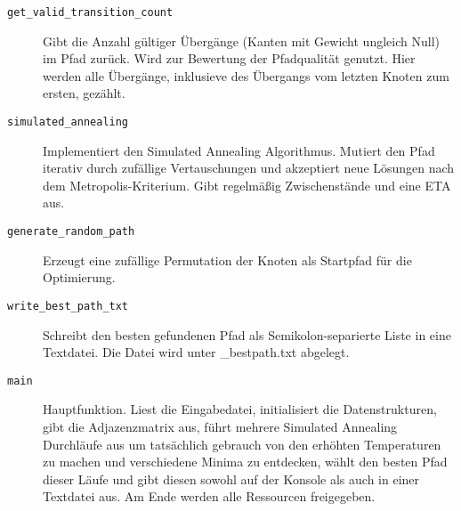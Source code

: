 \documentclass{article}
\begin{document}
\begin{description}
    \item[\texttt{get\_valid\_transition\_count}] Gibt die Anzahl gültiger Übergänge (Kanten mit Gewicht ungleich Null) im Pfad zurück. Wird zur Bewertung der Pfadqualität genutzt. Hier werden alle Übergänge, inklusieve des Übergangs vom letzten Knoten zum ersten, gezählt.
    \item[\texttt{simulated\_annealing}] Implementiert den Simulated Annealing Algorithmus. Mutiert den Pfad iterativ durch zufällige Vertauschungen und akzeptiert neue Lösungen nach dem Metropolis-Kriterium. Gibt regelmäßig Zwischenstände und eine ETA aus.
    \item[\texttt{generate\_random\_path}] Erzeugt eine zufällige Permutation der Knoten als Startpfad für die Optimierung.
    \item[\texttt{write\_best\_path\_txt}] Schreibt den besten gefundenen Pfad als Semikolon-separierte Liste in eine Textdatei. Die Datei wird unter \_bestpath.txt abgelegt.
    \item[\texttt{main}] Hauptfunktion. Liest die Eingabedatei, initialisiert die Datenstrukturen, gibt die Adjazenzmatrix aus, führt mehrere Simulated Annealing Durchläufe aus um tatsächlich gebrauch von den erhöhten Temperaturen zu machen und verschiedene Minima zu entdecken, wählt den besten Pfad dieser Läufe und gibt diesen sowohl auf der Konsole als auch in einer Textdatei aus. Am Ende werden alle Ressourcen freigegeben.
\end{description}
\end{document}
